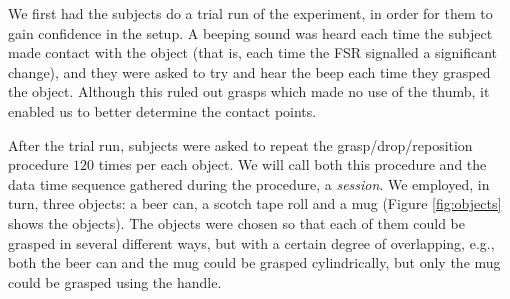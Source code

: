 We first had the subjects do a trial run of the experiment, in order
for them to gain confidence in the setup. A beeping sound was heard
each time the subject made contact with the object (that is, each time
the FSR signalled a significant change), and they were asked to try
and hear the beep each time they grasped the object. Although this
ruled out grasps which made no use of the thumb, it enabled us to
better determine the contact points.

After the trial run, subjects were asked to repeat the
grasp/drop/reposition procedure $120$ times per each object. We will
call both this procedure and the data time sequence gathered during
the procedure, a \emph{session}. We employed, in turn, three objects:
a beer can, a scotch tape roll and a mug (Figure \ref{fig:objects}
shows the objects). The objects were chosen so that each of them could be
grasped in several different ways, but with a certain degree of
overlapping, e.g., both the beer can and the mug could be grasped
cylindrically, but only the mug could be grasped using the handle.


